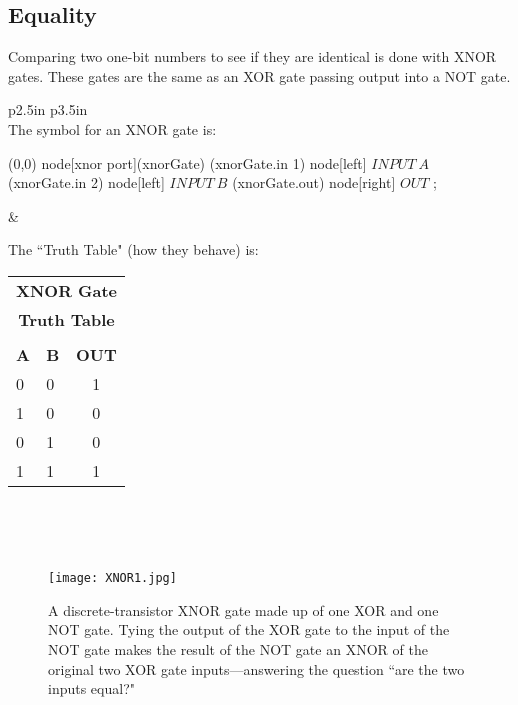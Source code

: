 \clearpage

\subsection*{Equality}

Comparing two one-bit numbers to see if they are identical is done with XNOR gates. These gates are the same as an XOR gate passing output into a NOT gate. 

\begin{center}

\begin{tabular}{p{2.5in} p{3.5in} }
\hline\\[\negsep]

The symbol for an XNOR gate is:

\vspace{0.25in}

\begin{circuitikz}
\draw
	(0,0) node[xnor port](xnorGate) {}
	(xnorGate.in 1) node[left] {{\color{red}$INPUT~A$}}
	(xnorGate.in 2) node[left] {{\color{red}$INPUT~B$}}
	(xnorGate.out) node[right] {{\color{red}$OUT$}}
;
\end{circuitikz}

&

\centering

The ``Truth Table" (how they behave) is: 
\vspace{0.15in}

\begin{tabular}{ll | c}
\multicolumn{3}{c}{\textbf{XNOR Gate }}\\
\multicolumn{3}{c}{\textbf{Truth Table}}\\
\hline\\[\negsep]
\textbf{A} & \textbf{B} & \textbf{OUT}\\
\hline
0 & 0 & 1  \\
1 & 0 & 0  \\
0 & 1 & 0  \\
1 & 1 & 1  \\
\hline
\end{tabular}
\\
\tabularnewline

\hline\\[\negsep]

\end{tabular}
\end{center}

\begin{figure}[hb!]
\begin{center}
\texttt{[image: XNOR1.jpg]}
\caption{A discrete-transistor XNOR gate made up of one XOR and one NOT gate. Tying the output of the XOR gate to the input of the NOT gate makes the result of the NOT gate an XNOR of the original two XOR gate inputs---answering the question ``are the two inputs equal?"}
\end{center}
\end{figure}

